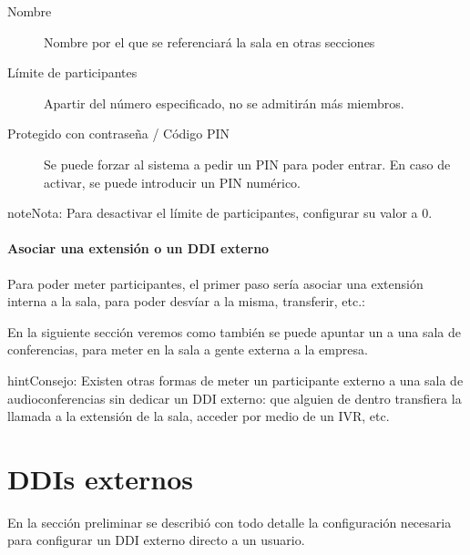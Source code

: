 \documentclass[letterpaper,10pt,spanish]{sphinxmanual}
\begin{document}
\noindent{}
\begin{description}
\item[{Nombre}] \leavevmode{}\label{pbx_features/conference_rooms:term-name}
Nombre por el que se referenciará la sala en otras secciones

\item[{Límite de participantes}] \leavevmode{}\label{pbx_features/conference_rooms:term-max-members}
Apartir del número especificado, no se admitirán más miembros.

\item[{Protegido con contraseña / Código PIN}] \leavevmode{}\label{pbx_features/conference_rooms:term-pin-protected}
Se puede forzar al sistema a pedir un PIN para poder entrar. En caso de activar, se puede introducir un PIN numérico.

\end{description}

\begin{notice}{note}{Nota:}
Para desactivar el límite de participantes, configurar su valor a 0.
\end{notice}
\paragraph{Asociar una extensión o un DDI externo}

Para poder meter participantes, el primer paso sería asociar una extensión interna a la sala, para poder desvíar a la misma, transferir, etc.:

\noindent{}

En la siguiente sección veremos como también se puede apuntar un {\hyperref[pbx_features/external_ddis:external\string-ddis]{}} a una sala de conferencias, para meter en la sala a gente externa a la empresa.

\begin{notice}{hint}{Consejo:}
Existen otras formas de meter un participante externo a una sala de audioconferencias sin dedicar un DDI externo: que alguien de dentro transfiera la llamada a la extensión de la sala, acceder por medio de un IVR, etc.
\end{notice}


\section{DDIs externos}
\label{pbx_features/external_ddis:external-ddis}\label{pbx_features/external_ddis::doc}\label{pbx_features/external_ddis:id1}
En la sección preliminar {\hyperref[external_incoming_calls/configure_ddi:settingup\string-ddi]{}} se describió con todo detalle la configuración necesaria para configurar un DDI externo directo a un usuario.
\end{document}
